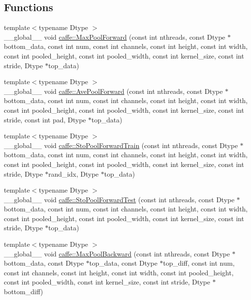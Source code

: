 \subsection*{Functions}
\begin{DoxyCompactItemize}
\item 
{\footnotesize template$<$typename Dtype $>$ }\\\+\_\+\+\_\+global\+\_\+\+\_\+ void \hyperlink{namespacecaffe_a9b99970c8e86778efc90dd9e9aaf2b7e}{caffe\+::\+Max\+Pool\+Forward} (const int nthreads, const Dtype $\ast$bottom\+\_\+data, const int num, const int channels, const int height, const int width, const int pooled\+\_\+height, const int pooled\+\_\+width, const int kernel\+\_\+size, const int stride, Dtype $\ast$top\+\_\+data)
\item 
{\footnotesize template$<$typename Dtype $>$ }\\\+\_\+\+\_\+global\+\_\+\+\_\+ void \hyperlink{namespacecaffe_ae5570ee550fedfed62ebdc91ee33f23b}{caffe\+::\+Ave\+Pool\+Forward} (const int nthreads, const Dtype $\ast$bottom\+\_\+data, const int num, const int channels, const int height, const int width, const int pooled\+\_\+height, const int pooled\+\_\+width, const int kernel\+\_\+size, const int stride, const int pad, Dtype $\ast$top\+\_\+data)
\item 
{\footnotesize template$<$typename Dtype $>$ }\\\+\_\+\+\_\+global\+\_\+\+\_\+ void \hyperlink{namespacecaffe_aecd2fb4a16d7a1864dc9774cf8035264}{caffe\+::\+Sto\+Pool\+Forward\+Train} (const int nthreads, const Dtype $\ast$bottom\+\_\+data, const int num, const int channels, const int height, const int width, const int pooled\+\_\+height, const int pooled\+\_\+width, const int kernel\+\_\+size, const int stride, Dtype $\ast$rand\+\_\+idx, Dtype $\ast$top\+\_\+data)
\item 
{\footnotesize template$<$typename Dtype $>$ }\\\+\_\+\+\_\+global\+\_\+\+\_\+ void \hyperlink{namespacecaffe_ad9cf8043e680796318b7bad79c2bc481}{caffe\+::\+Sto\+Pool\+Forward\+Test} (const int nthreads, const Dtype $\ast$bottom\+\_\+data, const int num, const int channels, const int height, const int width, const int pooled\+\_\+height, const int pooled\+\_\+width, const int kernel\+\_\+size, const int stride, Dtype $\ast$top\+\_\+data)
\item 
{\footnotesize template$<$typename Dtype $>$ }\\\+\_\+\+\_\+global\+\_\+\+\_\+ void \hyperlink{namespacecaffe_a22c07bd08af73d0383ddb0b74ae72534}{caffe\+::\+Max\+Pool\+Backward} (const int nthreads, const Dtype $\ast$bottom\+\_\+data, const Dtype $\ast$top\+\_\+data, const Dtype $\ast$top\+\_\+diff, const int num, const int channels, const int height, const int width, const int pooled\+\_\+height, const int pooled\+\_\+width, const int kernel\+\_\+size, const int stride, Dtype $\ast$bottom\+\_\+diff)

\end{DoxyCompactItemize}
